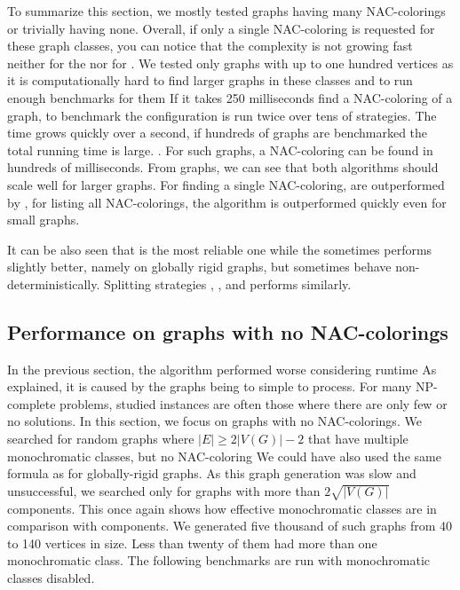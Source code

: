To summarize this section, we mostly tested graphs having many NAC-colorings
or trivially having none.
Overall, if only a single NAC-coloring is requested
for these graph classes, you can notice that the complexity
is not growing fast neither for the \NaiveCycles{} nor for \Subgraphs{}.
We tested only graphs with up to one hundred vertices
as it is computationally hard to find larger graphs in these classes
and to run enough benchmarks for them
{
	If it takes 250 milliseconds find a NAC-coloring of a graph,
	to benchmark the configuration is run twice over tens of strategies.
	The time grows quickly over a second,
	if hundreds of graphs are benchmarked
	the total running time is large.
}.
For such graphs, a NAC-coloring can be found in hundreds of milliseconds.
From graphs, we can see that both algorithms should scale well for larger graphs.
For finding a single NAC-coloring, \Subgraphs{} are outperformed by \NaiveCycles{},
for listing all NAC-colorings, the \NaiveCycles{} algorithm
is outperformed quickly even for small graphs.

It can be also seen that \MergeLinear{} is the most reliable one
while the \SharedVertices{} sometimes performs slightly better,
namely on globally rigid graphs,
but sometimes behave non-deterministically.
%
Splitting strategies \None{}, \CycleMask{}, \Neighbors{} and \NeighborsDegree{}
performs similarly.


\subsection{Performance on graphs with no NAC-colorings}

In the previous section, the \Subgraphs{} algorithm performed worse considering runtime
As explained, it is caused by the graphs being to simple to process.
%
For many NP-complete problems, studied instances are often
those where there are only few or no solutions.
In this section, we focus on graphs with no NAC-colorings.
%
We searched for random graphs where \( |E| \ge 2|V(G)| - 2 \) that have
multiple monochromatic classes, but no NAC-coloring
{We could have also used the same formula as for globally-rigid graphs}.
%
As this graph generation was slow and unsuccessful, we searched only for
graphs with more than \( 2\sqrt{|V(G)|} \) \trcon{} components.
%
This once again shows how effective monochromatic classes are
in comparison with \trcon{} components.
We generated five thousand of such graphs from 40 to 140 vertices in size.
Less than twenty of them had more than one monochromatic class.
%
The following benchmarks are run with monochromatic classes disabled.

